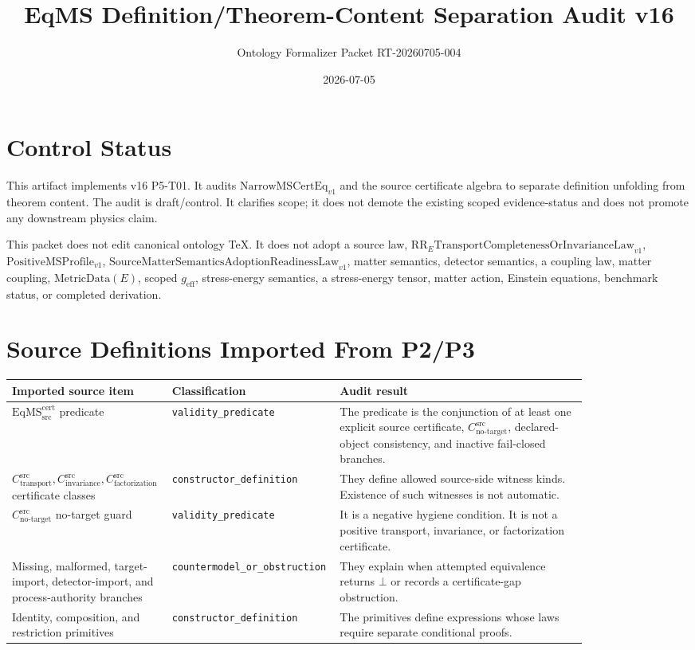 \documentclass[11pt]{article}
\title{EqMS Definition/Theorem-Content Separation Audit v16}
\author{Ontology Formalizer Packet RT-20260705-004}
\date{2026-07-05}
\newcommand{\EqMScert}{\mathrm{EqMS}^{\mathrm{cert}}_{\mathrm{src}}}
\newcommand{\NarrowMSCertEq}{\mathrm{NarrowMSCertEq}_{v1}}
\newcommand{\CTr}{C_{\mathrm{transport}}^{\mathrm{src}}}
\newcommand{\CInv}{C_{\mathrm{invariance}}^{\mathrm{src}}}
\newcommand{\CFact}{C_{\mathrm{factorization}}^{\mathrm{src}}}
\newcommand{\CNTI}{C_{\mathrm{no\text{-}target}}^{\mathrm{src}}}
\newcommand{\Bottom}{\bot}
\newcommand{\RRELaw}{\mathrm{RR}_{E}\mathrm{TransportCompletenessOrInvarianceLaw}_{v1}}
\newcommand{\PositiveMSProfile}{\mathrm{PositiveMSProfile}_{v1}}
\newcommand{\SMSAR}{\mathrm{SourceMatterSemanticsAdoptionReadinessLaw}_{v1}}
\newcommand{\MetricData}{\mathrm{MetricData}}
\newcommand{\geff}{g_{\mathrm{eff}}}
\begin{document}
\maketitle

\section{Control Status}

This artifact implements v16 P5-T01. It audits \(\NarrowMSCertEq\) and the
source certificate algebra to separate definition unfolding from theorem
content. The audit is draft/control. It clarifies scope; it does not demote
the existing scoped evidence-status and does not promote any downstream
physics claim.

This packet does not edit canonical ontology TeX. It does not adopt a source
law, \(\RRELaw\), \(\PositiveMSProfile\), \(\SMSAR\), matter semantics,
detector semantics, a coupling law, matter coupling, \(\MetricData(E)\),
scoped \(\geff\), stress-energy semantics, a stress-energy tensor, matter
action, Einstein equations, benchmark status, or completed derivation.

\section{Source Definitions Imported From P2/P3}

\begin{longtable}{p{0.24\linewidth}p{0.18\linewidth}p{0.42\linewidth}}
\toprule
Imported source item & Classification & Audit result \\
\midrule
\(\EqMScert\) predicate & \texttt{validity\_predicate} &
The predicate is the conjunction of at least one explicit source certificate,
\(\CNTI\), declared-object consistency, and inactive fail-closed branches. \\
\(\CTr,\CInv,\CFact\) certificate classes & \texttt{constructor\_definition} &
They define allowed source-side witness kinds. Existence of such witnesses is
not automatic. \\
\(\CNTI\) no-target guard & \texttt{validity\_predicate} &
It is a negative hygiene condition. It is not a positive transport,
invariance, or factorization certificate. \\
Missing, malformed, target-import, detector-import, and process-authority
branches & \texttt{countermodel\_or\_obstruction} &
They explain when attempted equivalence returns \(\Bottom\) or records a
certificate-gap obstruction. \\
Identity, composition, and restriction primitives & \texttt{constructor\_definition} &
The primitives define expressions whose laws require separate conditional
proofs. \\
\bottomrule
\end{longtable}
\end{document}
